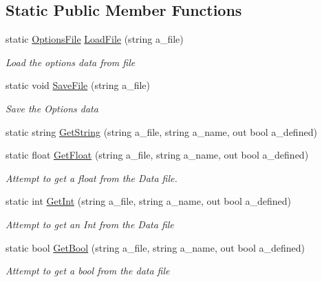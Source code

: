 \subsection*{Static Public Member Functions}
\begin{DoxyCompactItemize}
\item 
static \mbox{\hyperlink{class_options_file}{Options\+File}} \mbox{\hyperlink{class_options_file_ac77fcecfa3e8693e76c52411c612720c}{Load\+File}} (string a\+\_\+file)
\begin{DoxyCompactList}\small\item\em Load the options data from file \end{DoxyCompactList}\item 
static void \mbox{\hyperlink{class_options_file_a4c4f2e244de41428463e563442387223}{Save\+File}} (string a\+\_\+file)
\begin{DoxyCompactList}\small\item\em Save the Options data \end{DoxyCompactList}\item 
static string \mbox{\hyperlink{class_options_file_ac4a1f6e33de1e7e8bb453ab8597b2258}{Get\+String}} (string a\+\_\+file, string a\+\_\+name, out bool a\+\_\+defined)
\item 
static float \mbox{\hyperlink{class_options_file_a128957aa50ad83f1c5df353c69875bdb}{Get\+Float}} (string a\+\_\+file, string a\+\_\+name, out bool a\+\_\+defined)
\begin{DoxyCompactList}\small\item\em Attempt to get a float from the Data file. \end{DoxyCompactList}\item 
static int \mbox{\hyperlink{class_options_file_a54ab3cc11b484e3b569bb39ff447cba4}{Get\+Int}} (string a\+\_\+file, string a\+\_\+name, out bool a\+\_\+defined)
\begin{DoxyCompactList}\small\item\em Attempt to get an Int from the Data file \end{DoxyCompactList}\item 
static bool \mbox{\hyperlink{class_options_file_a182edb602fbf1a458da36f1af493e22b}{Get\+Bool}} (string a\+\_\+file, string a\+\_\+name, out bool a\+\_\+defined)
\begin{DoxyCompactList}\small\item\em Attempt to get a bool from the data file \end{DoxyCompactList}\item 

\end{DoxyCompactItemize}
